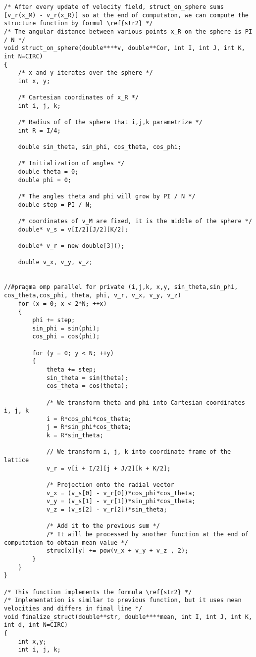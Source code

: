 \begin{lstlisting}
/* After every update of velocity field, struct_on_sphere sums [v_r(x_M) - v_r(x_R)] so at the end of computaton, we can compute the structure function by formul \ref{str2} */
/* The angular distance between various points x_R on the sphere is PI / N */ 
void struct_on_sphere(double****v, double**Cor, int I, int J, int K, int N=CIRC)
{
	/* x and y iterates over the sphere */
	int x, y;
	
	/* Cartesian coordinates of x_R */
	int i, j, k;

	/* Radius of of the sphere that i,j,k parametrize */
	int R = I/4;

	double sin_theta, sin_phi, cos_theta, cos_phi;

	/* Initialization of angles */
	double theta = 0;
	double phi = 0;
	
	/* The angles theta and phi will grow by PI / N */
	double step = PI / N;
	
	/* coordinates of v_M are fixed, it is the middle of the sphere */
	double* v_s = v[I/2][J/2][K/2];
	
	double* v_r = new double[3]();

	double v_x, v_y, v_z;


//#pragma omp parallel for private (i,j,k, x,y, sin_theta,sin_phi, cos_theta,cos_phi, theta, phi, v_r, v_x, v_y, v_z)
	for (x = 0; x < 2*N; ++x)
	{
		phi += step;
		sin_phi = sin(phi);
		cos_phi = cos(phi);

		for (y = 0; y < N; ++y)
		{
			theta += step;
			sin_theta = sin(theta);
			cos_theta = cos(theta);

			/* We transform theta and phi into Cartesian coordinates i, j, k
			i = R*cos_phi*cos_theta;
			j = R*sin_phi*cos_theta;
			k = R*sin_theta;

			// We transform i, j, k into coordinate frame of the lattice			
			v_r = v[i + I/2][j + J/2][k + K/2];

			/* Projection onto the radial vector 
			v_x = (v_s[0] - v_r[0])*cos_phi*cos_theta;
			v_y = (v_s[1] - v_r[1])*sin_phi*cos_theta;
			v_z = (v_s[2] - v_r[2])*sin_theta;
			
			/* Add it to the previous sum */
			/* It will be processed by another function at the end of computation to obtain mean value */
			struc[x][y] += pow(v_x + v_y + v_z , 2);		
		}
	}
}

/* This function implements the formula \ref{str2} */
/* Implementation is similar to previous function, but it uses mean velocities and differs in final line */
void finalize_struct(double**str, double****mean, int I, int J, int K, int d, int N=CIRC)
{
	int x,y;
	int i, j, k;


\end{lstlisting}
